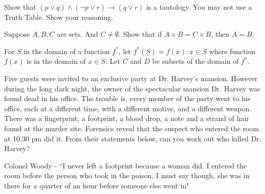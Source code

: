 \documentclass[addpoints]{exam}
\begin{document}
\begin{questions}
\begin{parts}
\end{parts}

\question[10] Show that $(p\vee q) \wedge (\neg p \vee r)\rightarrow (q \vee r)$ is a tautology. You may not use a Truth Table. Show your reasoning.

  \begin{solution}
  \end{solution}

\question[20] Suppose $A, B, C$ are sets. And $C \neq \emptyset$. Show that if $A \times B = C \times B$, then $A = B$.

  \begin{solution}
  \end{solution}
\question For $S$ in the domain of a function $f^*$, let $f^*(S) = {f(x) : x\in S}$ where function $f(x)$ is in the domain of $x\in S$. Let $C$ and $D$ be subsets of the domain of $f^*$.

\question
    Five guests were invited to an exclusive party at Dr. Harvey's mansion. However during the long dark night, the owner of the spectacular mansion Dr. Harvey was found dead in his office. The trouble is, every member of the party went to his office, each at a different time, with a different motive, and a different weapon. There was a fingerprint, a footprint, a blood drop, a note and a strand of hair found at the murder site. Forensics reveal that the suspect who entered the room at 10.30 pm did it. From their statements below, can you work out who killed Dr. Harvey? 

Colonel Woody - ``I never left a footprint because a woman did. I entered the room before the person who took in the poison. I must say though, she was in there for a quarter of an hour before someone else went in"


\end{questions}
\end{document}
